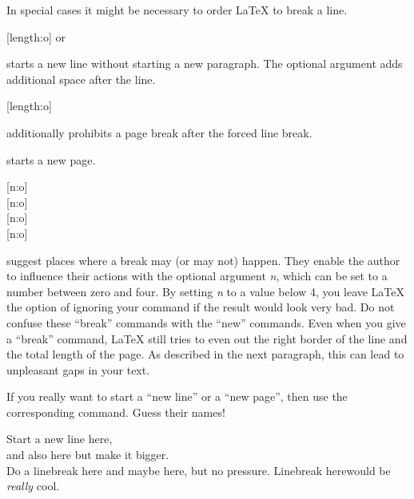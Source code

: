 In special cases it might be necessary to order \LaTeX{} to break a
line.
\begin{lscommand}
  \csi{\bs}[length:o] or 
\end{lscommand}
starts a new line without starting a new paragraph. The optional 
argument adds additional space after the line.

\begin{lscommand}
  \csi{\bs*}[length:o]
\end{lscommand}
additionally prohibits a page break after the forced line break.

\begin{lscommand}
\end{lscommand}
starts a new page.

\begin{lscommand}
  [n:o] \\
  [n:o] \\
  [n:o] \\
  [n:o]
\end{lscommand}
suggest places where a break may (or may not) happen.
They enable the author to influence their
actions with the optional argument \emph{n}, which can be set to a number
between zero and four. By setting \emph{n} to a value below 4, you leave
\LaTeX{} the option of ignoring your command if the result would look very
bad. Do not confuse these \enquote{break} commands with the \enquote{new}
commands. Even when you give a \enquote{break} command, \LaTeX{} still tries to
even out the right border of the line and the total length of the page. As
described in the next paragraph, this can lead to unpleasant gaps in your text.

If you really want to start a \enquote{new line} or a \enquote{new page}, then
use the corresponding command. Guess their names!
\begin{example}[examplewidth=0.4\linewidth]
  Start a new line here,\\
  and also here but make
  it bigger.\\[1cm]
  Do a linebreak here\linebreak
  and maybe here, \linebreak[1]
  but no pressure.
  Linebreak here\linebreak[3]
  would be \emph{really} cool.
\end{example}

